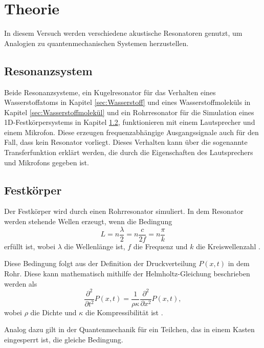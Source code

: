 \section{Theorie}
\label{sec:Theorie}

In diesem Versuch werden verschiedene akustische Resonatoren genutzt, um Analogien zu quantenmechanischen Systemen herzustellen. 

\subsection{Resonanzsystem}

Beide Resonanzsysteme, ein Kugelresonator für das Verhalten eines Wasserstoffatoms in Kapitel \ref{sec:Wasserstoff} und eines Wasserstoffmoleküls in Kapitel \ref{sec:Wasserstoffmolekül}  und ein Rohrresonator für die Simulation eines 1D-Festkörpersystems in Kapitel \ref{sec:Festkörper}, funktionieren mit einem Lautsprecher und einem Mikrofon. Diese erzeugen frequenzabhängige Ausgangssignale auch für den Fall, dass kein Resonator vorliegt.
Dieses Verhalten kann über die sogenannte Transferfunktion erklärt werden, die durch die Eigenschaften des Lautsprechers und Mikrofons gegeben ist. 

\subsection{Festkörper}
\label{sec:Festkörper}
Der Festkörper wird durch einen Rohrresonator simuliert. In dem Resonator werden stehende Wellen erzeugt, wenn die Bedingung  
\begin{equation}
    L = n \frac{\lambda}{2} = n \frac{c}{2f} = n \frac{\pi}{k} 
    \label{eq:speed}
\end{equation}
erfüllt ist, wobei $\lambda$ die Wellenlänge ist, $f$ die Frequenz und $k$ die Kreiswellenzahl \cite{QM1}. 

Diese Bedingung folgt aus der Definition der Druckverteilung $P(x,t)$ in dem Rohr. Diese kann mathematisch mithilfe der Helmholtz-Gleichung beschrieben werden als 
\begin{equation*}
    \frac{\partial^2}{\partial t^2} P(x,t) = \frac{1}{\rho\kappa}\frac{\partial^2}{\partial x^2} P(x,t),
\end{equation*}
wobei $\rho$ die Dichte und $\kappa$ die Kompressibilität ist \cite{QM1}. 

Analog dazu gilt in der Quantenmechanik für ein Teilchen, das in einem Kasten eingesperrt ist, die gleiche Bedingung. 

